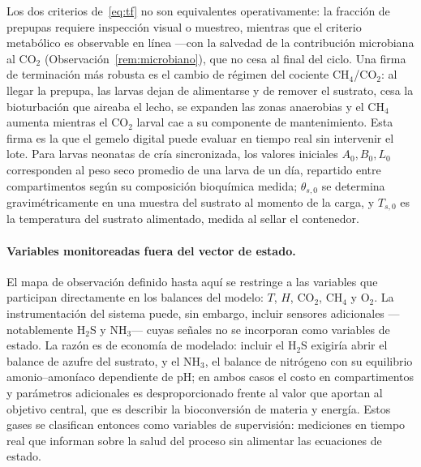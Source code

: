 \begin{remark}
\label{rem:tf}
Los dos criterios de~\eqref{eq:tf} no son equivalentes operativamente: la fracci\'on de prepupas requiere inspecci\'on visual o muestreo, mientras que el criterio metab\'olico es observable en l\'inea ---con la salvedad de la contribuci\'on microbiana al CO$_2$ (Observaci\'on~\ref{rem:microbiano}), que no cesa al final del ciclo. Una firma de terminaci\'on m\'as robusta es el cambio de r\'egimen del cociente CH$_4$/CO$_2$: al llegar la prepupa, las larvas dejan de alimentarse y de remover el sustrato, cesa la bioturbaci\'on que aireaba el lecho, se expanden las zonas anaerobias y el CH$_4$ aumenta mientras el CO$_2$ larval cae a su componente de mantenimiento. Esta firma es la que el gemelo digital puede evaluar en tiempo real sin intervenir el lote. Para larvas neonatas de cr\'ia sincronizada, los valores iniciales $A_0, B_0, L_0$ corresponden al peso seco promedio de una larva de un d\'ia, repartido entre compartimentos seg\'un su composici\'on bioqu\'imica medida; $\theta_{s,0}$ se determina gravim\'etricamente en una muestra del sustrato al momento de la carga, y $T_{s,0}$ es la temperatura del sustrato alimentado, medida al sellar el contenedor.
\end{remark}

\paragraph{Variables monitoreadas fuera del vector de estado.} El mapa de observaci\'on definido hasta aqu\'i se restringe a las variables que participan directamente en los balances del modelo: $T$, $H$, CO$_2$, CH$_4$ y O$_2$. La instrumentaci\'on del sistema puede, sin embargo, incluir sensores adicionales ---notablemente H$_2$S y NH$_3$--- cuyas se\~nales no se incorporan como variables de estado. La raz\'on es de econom\'ia de modelado: incluir el H$_2$S exigir\'ia abrir el balance de azufre del sustrato, y el NH$_3$, el balance de nitr\'ogeno con su equilibrio amonio--amon\'iaco dependiente de pH; en ambos casos el costo en compartimentos y par\'ametros adicionales es desproporcionado frente al valor que aportan al objetivo central, que es describir la bioconversi\'on de materia y energ\'ia. Estos gases se clasifican entonces como variables de supervisi\'on: mediciones en tiempo real que informan sobre la salud del proceso sin alimentar las ecuaciones de estado.

